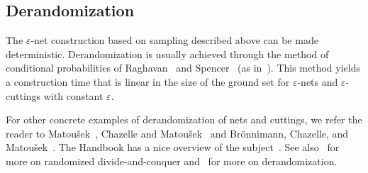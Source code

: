 \subsection{Derandomization}

The
\(\varepsilon\)-net
construction based on sampling
described above can be made deterministic.
%
Derandomization is usually achieved through
the method of conditional probabilities of Raghavan~\cite{Rag88}
and Spencer~\cite{Spe94} (as in~\cite{C93}).
%
This method yields a construction time that is linear in the size of
the ground set for \(\varepsilon\)-nets and \(\varepsilon\)-cuttings with
constant \(\varepsilon\).
%


For other concrete examples of derandomization of nets and cuttings, we
refer the reader to Matou\v{s}ek~\cite{M96}, Chazelle and
Matou\v{s}ek~\cite{CM96} and Brönnimann, Chazelle, and Matou\v{s}ek~\cite{BCM99}.
%
The Handbook has a nice overview of the
subject~\cite[Section~40.7]{CMR04}.
See also~\cite[Section~40.1]{CMR04} for more on randomized divide-and-conquer
and~\cite[Section~40.6]{CMR04} for more on derandomization.
%
